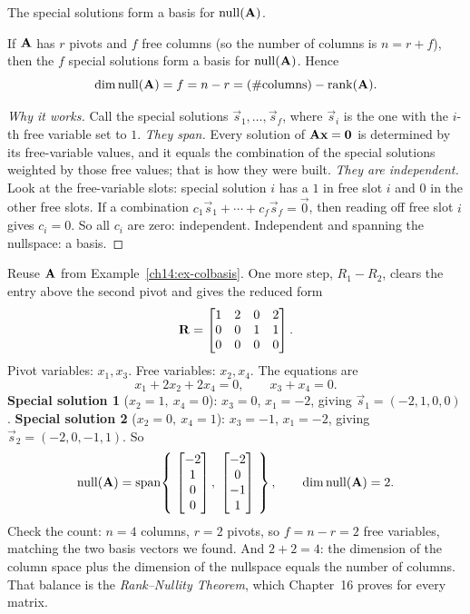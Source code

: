 The special solutions form a basis for $\operatorname{null}(\mathbf{A})$.

\begin{theorem}
\label{ch14:thm-nullbasis}
If $\mathbf{A}$ has $r$ pivots and $f$ free columns (so the number of columns is $n =
r + f$), then the $f$ special solutions form a basis for $\operatorname{null}(\mathbf{A})$. Hence
\[
  \operatorname{dim}\operatorname{null}(\mathbf{A}) = f = n - r = (\#\text{columns}) - \operatorname{rank}(\mathbf{A}).
\]
\end{theorem}

\begin{proof}[Why it works]
Call the special solutions $\vec{s}_1,\dots,\vec{s}_f$, where $\vec{s}_i$ is the one
with the $i$-th free variable set to $1$.
\emph{They span.} Every solution of $\mathbf{A}\mathbf{x}=\mathbf{0}$ is determined by its
free-variable values, and it equals the combination of the
special solutions weighted by those free values; that is how they were built.
\emph{They are independent.} Look at the free-variable slots: special solution $i$
has a $1$ in free slot $i$ and $0$ in the other free slots. If a combination
$c_1\vec{s}_1 + \cdots + c_f\vec{s}_f = \vec{0}$, then reading off free slot $i$ gives $c_i = 0$.
So all $c_i$ are zero: independent. Independent and spanning the nullspace: a basis.
\end{proof}

\begin{example}
\label{ch14:ex-nullbasis}
Reuse $\mathbf{A}$ from Example~\ref{ch14:ex-colbasis}. One more step, $R_1 - R_2$,
clears the entry above the second pivot and gives the reduced form
\[
  \mathbf{R}=\begin{bmatrix} 1 & 2 & 0 & 2\\ 0 & 0 & 1 & 1\\ 0 & 0 & 0 & 0\end{bmatrix}.
\]
Pivot variables: $x_1, x_3$. Free variables: $x_2, x_4$. The equations are
\[
  x_1 + 2x_2 + 2x_4 = 0,\qquad x_3 + x_4 = 0.
\]
\textbf{Special solution 1} ($x_2=1,\ x_4=0$): $x_3 = 0$, $x_1 = -2$, giving
$\vec{s}_1 = (-2,1,0,0)$.
\textbf{Special solution 2} ($x_2=0,\ x_4=1$): $x_3 = -1$, $x_1 = -2$, giving
$\vec{s}_2 = (-2,0,-1,1)$. So
\[
  \nullsp(\mat{A}) = \spn\!\left\{\ \colvec{-2\\1\\0\\0},\ \colvec{-2\\0\\-1\\1}\ \right\},
  \qquad \dimn\nullsp(\mat{A}) = 2.
\]
Check the count: $n = 4$ columns, $r = 2$ pivots, so $f = n - r = 2$
free variables, matching the two basis vectors we found. And $2 + 2 = 4$: the
dimension of the column space plus the dimension of the nullspace equals the
number of columns. That balance is the \emph{Rank--Nullity Theorem}, which
Chapter~16 proves for every matrix.
\end{example}


